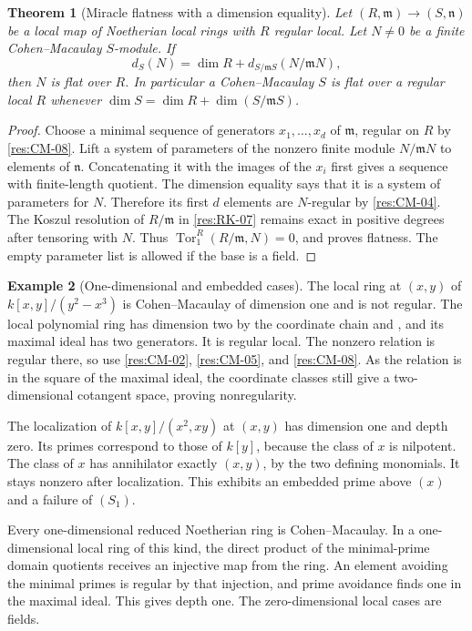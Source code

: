 \documentclass[11pt,oneside,openany]{book}
\newtheorem{theorem}{Theorem}[chapter]
\theoremstyle{definition}
\newtheorem{example}[theorem]{Example}
\theoremstyle{remark}
\begin{document}
\begin{theorem}[Miracle flatness with a dimension equality]
\label{res:CM-13}
Let $(R,\mathfrak m)\to(S,\mathfrak n)$ be a local map of
Noetherian local rings with $R$ regular local. Let $N\ne0$
be a finite Cohen--Macaulay $S$-module. If
\[
 d_S(N)=\dim R+d_{S/\mathfrak mS}(N/\mathfrak mN),
\]
then $N$ is flat over $R$. In particular a Cohen--Macaulay
$S$ is flat over a regular local $R$ whenever
$\dim S=\dim R+\dim(S/\mathfrak mS)$.
\end{theorem}
\begin{proof}
Choose a minimal sequence of generators $x_1,\ldots,x_d$
of $\mathfrak m$, regular on $R$ by \ref{res:CM-08}.
Lift a system of parameters of the nonzero finite module
$N/\mathfrak mN$ to elements of $\mathfrak n$. Concatenating
it with the images of the $x_i$ first gives a sequence with
finite-length quotient. The dimension equality says that
it is a system of parameters for $N$. Therefore its
first $d$ elements are $N$-regular by \ref{res:CM-04}.
The Koszul resolution of $R/\mathfrak m$ in
\ref{res:RK-07} remains exact in positive degrees after
tensoring with $N$. Thus $\operatorname{Tor}_1^R(R/\mathfrak m,N)=0$,
and \cite[Theorem ALG-05-C04-S03]{p103} proves flatness.
The empty parameter list is allowed if the base is a field.
\end{proof}

\begin{example}[One-dimensional and embedded cases]\label{res:CM-14}
The local ring at $(x,y)$ of $k[x,y]/(y^2-x^3)$ is
Cohen--Macaulay of dimension one and is not regular.
The local polynomial ring has dimension two by the
coordinate chain and \cite[Lemma polynomial-dimension]{p103},
and its maximal ideal has two generators. It is regular
local. The nonzero relation is regular there, so use
\ref{res:CM-02}, \ref{res:CM-05}, and \ref{res:CM-08}.
As the relation is in the square of the maximal ideal,
the coordinate classes still give a two-dimensional
cotangent space, proving nonregularity.

The localization of $k[x,y]/(x^2,xy)$ at $(x,y)$ has
dimension one and depth zero. Its primes correspond to
those of $k[y]$, because the class of $x$ is nilpotent.
The class of $x$ has annihilator exactly $(x,y)$, by the
two defining monomials. It stays nonzero after localization.
This exhibits an embedded prime above $(x)$ and a failure
of $(S_1)$.

Every one-dimensional reduced Noetherian ring is
Cohen--Macaulay. In a one-dimensional local ring of this
kind, the direct product of the minimal-prime domain
quotients receives an injective map from the ring. An
element avoiding the minimal primes is regular by that
injection, and prime avoidance finds one in the maximal
ideal. This gives depth one. The zero-dimensional local
cases are fields.
\end{example}
\end{document}
